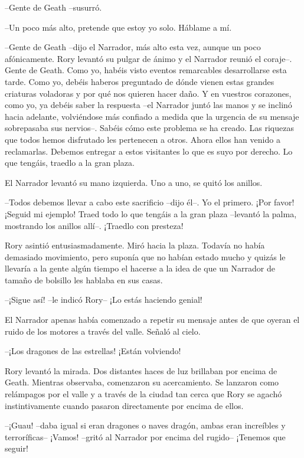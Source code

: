 {--Gente de Geath --susurró.}

{--Un poco más alto, pretende que estoy yo solo. Háblame a mí.}

{--Gente de Geath --dijo el Narrador, más alto esta vez, aunque un
	poco afónicamente. Rory levantó su pulgar de ánimo y el Narrador reunió
	el coraje--. Gente de Geath. Como yo, habéis visto eventos remarcables
	desarrollarse esta tarde. Como yo, debéis haberos preguntado de dónde
	vienen estas grandes criaturas voladoras y por qué nos quieren hacer
	daño. Y en vuestros corazones, como yo, ya debéis saber la respuesta
	--el Narrador juntó las manos y se inclinó hacia adelante, volviéndose
	más confiado a medida que la urgencia de su mensaje sobrepasaba sus
	nervios--. Sabéis cómo este problema se ha creado. Las riquezas que
	todos hemos disfrutado les pertenecen a otros. Ahora ellos han venido a
	reclamarlas. Debemos entregar a estos visitantes lo que es suyo por
derecho. Lo que tengáis, traedlo a la gran plaza.}

{El Narrador levantó su mano izquierda. Uno a uno, se quitó los
anillos.}

{--Todos debemos llevar a cabo este sacrificio --dijo él--. Yo el
	primero. ¡Por favor! ¡Seguid mi ejemplo! Traed todo lo que tengáis a la
	gran plaza --levantó la palma, mostrando los anillos allí--. ¡Traedlo
con presteza!}

{Rory asintió entusiasmadamente. Miró hacia la plaza. Todavía no había
	demasiado movimiento, pero suponía que no habían estado mucho y quizás
	le llevaría a la gente algún tiempo el hacerse a la idea de que un
Narrador de tamaño de bolsillo les hablaba en sus casas.}

{--¡Sigue así! --le indicó Rory-- ¡Lo estás haciendo genial!}

{El Narrador apenas había comenzado a repetir su mensaje antes de que
oyeran el ruido de los motores a través del valle. Señaló al cielo.}

{--¡Los dragones de las estrellas! ¡Están volviendo!}

{Rory levantó la mirada. Dos distantes haces de luz brillaban por encima
	de Geath. Mientras observaba, comenzaron su acercamiento. Se lanzaron
	como relámpagos por el valle y a través de la ciudad tan cerca que Rory
	se agachó instintivamente cuando pasaron directamente por encima de
ellos.}

{--¡Guau! --daba igual si eran dragones o naves dragón, ambas eran
	increíbles y terroríficas-- ¡Vamos! --gritó al Narrador por encima del
rugido-- ¡Tenemos que seguir!}

